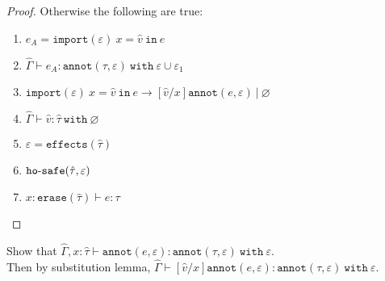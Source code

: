 \documentclass{llncs}
\newcommand{\keywadj}[1]{\mathtt{#1}}
\newcommand{\keyw}[1]{\keywadj{#1}~}
\newcommand{\kw}[1]{\keyw{ #1 }}
\newcommand{\kwa}[1]{\keywadj{ #1 }}
\newcommand{\hyphen}{\hbox{-}}
\begin{document}
\begin{proof}
Otherwise the following are true:
\begin{enumerate}
	\item $e_A = \kwa{import}(\varepsilon)~x = \hat v~\kw{in} e$
	\item $\hat \Gamma \vdash e_A: \kwa{annot}(\tau, \varepsilon)~\kw{with} \varepsilon \cup \varepsilon_1$
	\item $\kwa{import}(\varepsilon)~x = \hat v~\kw{in} e \longrightarrow [\hat v/x]\kwa{annot}(e, \varepsilon)~|~\varnothing$
	\item $\hat \Gamma \vdash \hat v: \hat \tau~\kw{with} \varnothing$
	\item $\varepsilon = \kwa{effects}(\hat \tau)$
	\item $\kwa{ho \hyphen safe}(\hat \tau, \varepsilon)$
	\item $x: \kwa{erase}(\hat \tau) \vdash e: \tau$
\end{enumerate}

\end{proof}

\noindent
Show that $\hat \Gamma, x: \hat \tau \vdash \kwa{annot}(e, \varepsilon): \kwa{annot}(\tau, \varepsilon)~\kw{with} \varepsilon$. \\

\noindent
Then by substitution lemma, $\hat \Gamma \vdash [\hat v/x]\kwa{annot}(e, \varepsilon): \kwa{annot}(\tau, \varepsilon)~\kw{with} \varepsilon$.
\end{document}
